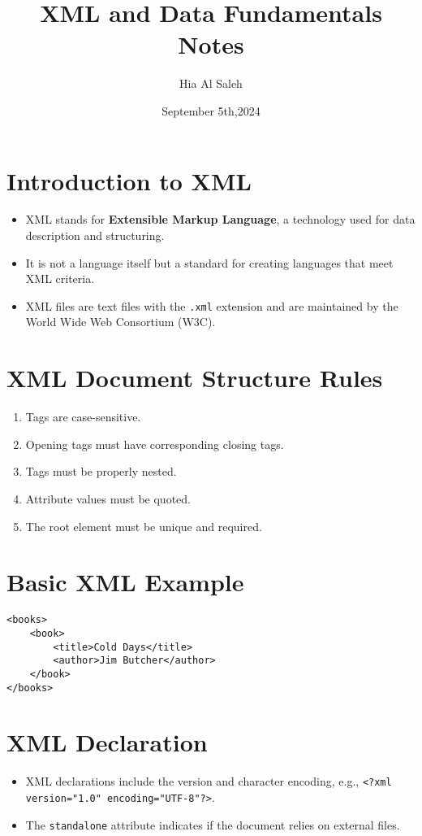 \documentclass{article}
\title{XML and Data Fundamentals Notes}
\author{Hia Al Saleh}
\date{September 5th,2024}
\begin{document}
\maketitle
\tableofcontents
\newpage 

\section{Introduction to XML}
\begin{itemize}
    \item XML stands for \textbf{Extensible Markup Language}, a technology used for data description and structuring.
    \item It is not a language itself but a standard for creating languages that meet XML criteria.
    \item XML files are text files with the \texttt{.xml} extension and are maintained by the World Wide Web Consortium (W3C).
\end{itemize}

\section{XML Document Structure Rules}
\begin{enumerate}
    \item Tags are case-sensitive.
    \item Opening tags must have corresponding closing tags.
    \item Tags must be properly nested.
    \item Attribute values must be quoted.
    \item The root element must be unique and required.
\end{enumerate}

\section{Basic XML Example}
\begin{verbatim}
<books>
    <book>
        <title>Cold Days</title>
        <author>Jim Butcher</author>
    </book>
</books>
\end{verbatim}

\section{XML Declaration}
\begin{itemize}
    \item XML declarations include the version and character encoding, e.g., \texttt{<?xml version="1.0" encoding="UTF-8"?>}.
    \item The \texttt{standalone} attribute indicates if the document relies on external files.
\end{itemize}
\end{document}
